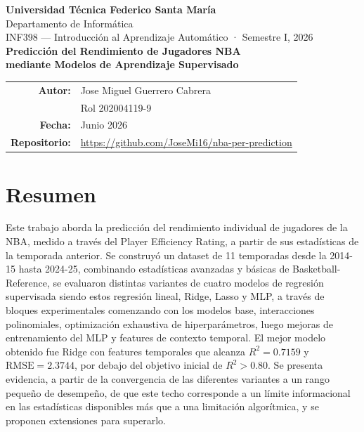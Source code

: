 \documentclass[11pt,a4paper]{article}
\begin{document}
\thispagestyle{empty}
\begin{center}
    {\large\bfseries Universidad Técnica Federico Santa María}\\[3pt]
    {\normalsize\color{gris} Departamento de Informática}\\[2pt]
    {\normalsize\color{gris} INF398 — Introducción al Aprendizaje Automático · Semestre I, 2026}\\[26pt]

    {\Large\bfseries Predicción del Rendimiento de Jugadores NBA}\\[6pt]
    {\Large\bfseries mediante Modelos de Aprendizaje Supervisado}\\[10pt]

    \begin{tabular}{rl}
        \textbf{Autor:}      & Jose Miguel Guerrero Cabrera \\
                             & Rol 202004119-9 \\[8pt]
        \textbf{Fecha:}      & Junio 2026 \\[8pt]
        \textbf{Repositorio:}& \url{https://github.com/JoseMi16/nba-per-prediction} \\
    \end{tabular}
\end{center}


\vspace{0.6cm}

\section{Resumen}

Este trabajo aborda la predicción del rendimiento individual de jugadores de
la NBA, medido a través del Player Efficiency Rating, a partir
de sus estadísticas de la temporada anterior. Se construyó un dataset de
11 temporadas desde la 2014-15 hasta 2024-25, combinando estadísticas avanzadas y básicas
de Basketball-Reference, se evaluaron distintas variantes de
cuatro modelos de regresión supervisada siendo estos regresión lineal, Ridge, Lasso y
MLP, a través de bloques experimentales comenzando con los modelos base, interacciones
polinomiales, optimización exhaustiva de hiperparámetros,  luego mejoras de
entrenamiento del MLP y features de contexto temporal. El mejor modelo
obtenido  fue Ridge con features temporales que alcanza $R^2=0.7159$ y
$\text{RMSE}=2.3744$, por debajo del objetivo inicial de $R^2 > 0.80$. Se
presenta evidencia, a partir de la convergencia de las diferentes variantes a un
rango pequeño de desempeño, de que este techo corresponde a un límite
informacional en las estadísticas disponibles más que a una limitación
algorítmica, y se proponen extensiones para superarlo.
\end{document}
